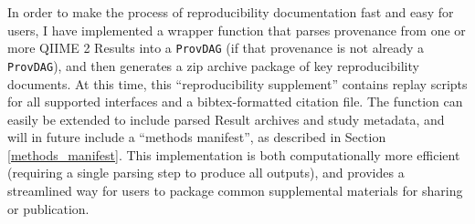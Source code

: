 In order to make the process of reproducibility documentation fast and easy for
users, I have implemented a wrapper function that parses provenance from one or
more QIIME 2 Results into a \texttt{ProvDAG} (if that provenance is not already a
\texttt{ProvDAG}), and then generates a zip archive package of key reproducibility
documents. At this time, this “reproducibility supplement” contains replay
scripts for all supported interfaces and a bibtex-formatted citation file. The
function can easily be extended to include parsed Result archives and study
metadata, and will in future include a “methods manifest”, as described in
Section \ref{methods_manifest}. This implementation is both computationally more efficient
(requiring a single parsing step to produce all outputs), and provides a
streamlined way for users to package common supplemental materials for sharing
or publication.
